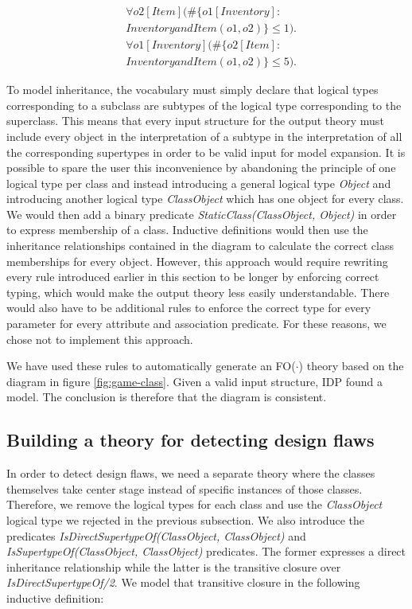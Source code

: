 \documentclass[conference]{IEEEtran}
\begin{document}
\begin{align*}
	&\forall{o2}[Item](\#\{o1[Inventory] : \\ &InventoryandItem(o1, o2)\} \leq 1). \\
	&\forall{o1}[Inventory](\#\{o2[Item] : \\ &InventoryandItem(o1, o2)\} \leq 5).
\end{align*}

To model inheritance, the vocabulary must simply declare that logical types corresponding to a subclass are subtypes of the logical type corresponding to the superclass. This means that every input structure for the output theory must include every object in the interpretation of a subtype in the interpretation of all the corresponding supertypes in order to be valid input for model expansion. It is possible to spare the user this inconvenience by abandoning the principle of one logical type per class and instead introducing a general logical type \textit{Object} and introducing another logical type \textit{ClassObject} which has one object for every class. We would then add a binary predicate \textit{StaticClass(ClassObject, Object)} in order to express membership of a class. Inductive definitions would then use the inheritance relationships contained in the diagram to calculate the correct class memberships for every object. However, this approach would require rewriting every rule introduced earlier in this section to be longer by enforcing correct typing, which would make the output theory less easily understandable. There would also have to be additional rules to enforce the correct type for every parameter for every attribute and association predicate. For these reasons, we chose not to implement this approach.

We have used these rules to automatically generate an FO($\cdot$) theory based on the diagram in figure \ref{fig:game-class}. Given a valid input structure, IDP found a model. The conclusion is therefore that the diagram is consistent.

\subsection{Building a theory for detecting design flaws}\label{sec:design-flaw}

In order to detect design flaws, we need a separate theory where the classes themselves take center stage instead of specific instances of those classes. Therefore, we remove the logical types for each class and use the \textit{ClassObject} logical type we rejected in the previous subsection. We also introduce the predicates \textit{IsDirectSupertypeOf(ClassObject, ClassObject)} and \textit{IsSupertypeOf(ClassObject, ClassObject)} predicates. The former expresses a direct inheritance relationship while the latter is the transitive closure over \textit{IsDirectSupertypeOf/2}. We model that transitive closure in the following inductive definition:
\end{document}
